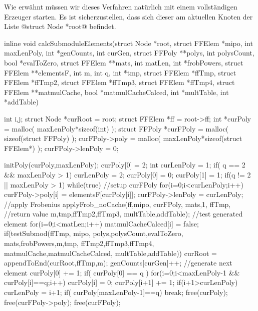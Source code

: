 Wie erwähnt müssen wir dieses Verfahren natürlich mit einem vollständigen
Erzeuger starten. Es ist sicherzustellen, dass sich dieser am aktuellen Knoten 
der Liste @struct Node *root@ befindet.

\begin{ccode}[caption={Aus \url{../Sage/enumeratePCNs.c}},
  firstnumber=953, label=lst:calcSubmoduleElements]
inline void calcSubmoduleElements(struct Node *root,
        struct FFElem *mipo,
        int maxLenPoly, 
        int *genCounts, int curGen,
        struct FFPoly **polys, int polysCount, bool *evalToZero,
        struct FFElem **mats, int matLen, int *frobPowers,
        struct FFElem **elementsF,
        int m, int q, int *tmp,
        struct FFElem *ffTmp, struct FFElem *ffTmp2, struct FFElem *ffTmp3, 
        struct FFElem *ffTmp4,
        struct FFElem **matmulCache, bool *matmulCacheCalced,
        int *multTable, int *addTable){
    int i,j;
    struct Node *curRoot = root;
    struct FFElem *ff = root->ff;
    int *curPoly = malloc( maxLenPoly*sizeof(int) );
    struct FFPoly *curFPoly = malloc( sizeof(struct FFPoly) );
    curFPoly->poly = malloc( maxLenPoly*sizeof(struct FFElem*) );
    curFPoly->lenPoly = 0;

    initPoly(curPoly,maxLenPoly);
    curPoly[0] = 2;
    int curLenPoly = 1;
    if( q == 2 && maxLenPoly > 1){
        curLenPoly = 2;
        curPoly[0] = 0;
        curPoly[1] = 1;
    }
    if(q != 2 || maxLenPoly > 1){
        while(true){
            //setup curFPoly
            for(i=0;i<curLenPoly;i++)
                curFPoly->poly[i] = elementsF[curPoly[i]];
            curFPoly->lenPoly = curLenPoly;
            //apply Frobenius
            applyFrob_noCache(ff,mipo,
                    curFPoly,
                    mats,1, ffTmp, //return value
                    m,tmp,ffTmp2,ffTmp3,
                    multTable,addTable);
            //test generated element
            for(i=0;i<matLen;i++) matmulCacheCalced[i] = false;
            if(testSubmod(ffTmp, mipo,
                    polys,polysCount,evalToZero,
                    mats,frobPowers,m,tmp,
                    ffTmp2,ffTmp3,ffTmp4,
                    matmulCache,matmulCacheCalced, multTable,addTable)){
                curRoot = appendToEnd(curRoot,ffTmp,m);
                genCounts[curGen]++;
            }
            //generate next element
            curPoly[0] += 1;
            if( curPoly[0] == q ){
                for(i=0;i<maxLenPoly-1 && curPoly[i]==q;i++){
                    curPoly[i] = 0;
                    curPoly[i+1] += 1;
                }
                if(i+1>curLenPoly)
                    curLenPoly = i+1;
                if( curPoly[maxLenPoly-1]==q){
                    break;
                }
            }
        }
    }
    free(curPoly);
    free(curFPoly->poly);
    free(curFPoly);
}
\end{ccode}

